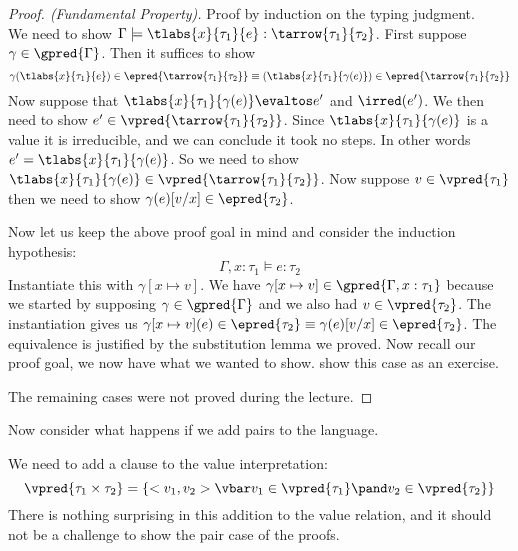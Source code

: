 \begin{proof}[Proof. (Fundamental Property)] Proof by induction on the typing judgment.
  \case{\TAbs} \\
We need to show $\Gamma \models \tlabs{x}{\tau_1}{e} : \tarrow{\tau_1}{\tau_2}$. First suppose $\gamma \in \gpred{\Gamma}$. Then it suffices to show
\[
  \gamma(\tlabs{x}{\tau_1}{e}) \in \epred{\tarrow{\tau_1}{\tau_2}} \equiv
  (\tlabs{x}{\tau_1}{\gamma(e)}) \in \epred{\tarrow{\tau_1}{\tau_2}}
\]
Now suppose that $\tlabs{x}{\tau_1}{\gamma(e)} \evaltos e'$ and $\irred(e')$. We then need to show $e' \in \vpred{\tarrow{\tau_1}{\tau_2}}$. Since $\tlabs{x}{\tau_1}{\gamma(e)}$ is a value it is irreducible, and we can conclude it took no steps. In other words $e' = \tlabs{x}{\tau_1}{\gamma(e)}$. So we need to show $\tlabs{x}{\tau_1}{\gamma(e)} \in \vpred{\tarrow{\tau_1}{\tau_2}}$. Now suppose $v \in \vpred{\tau_1}$ then we need to show $\gamma(e)[v/x] \in \epred{\tau_2}$.

Now let us keep the above proof goal in mind and consider the induction hypothesis:
\[
  \Gamma, x: \tau_1 \models e : \tau_2
\]
Instantiate this with $\gamma[x \mapsto v]$. We have $\gamma[x \mapsto v] \in \gpred{\Gamma, x : \tau_1}$ because we started by supposing $\gamma \in \gpred{\Gamma}$ and we also had $v \in \vpred{\tau_2}$. The instantiation gives us $\gamma[x \mapsto v] (e) \in  \epred{\tau_2} \equiv \gamma(e)[v/x] \in \epred{\tau_2}$. The equivalence is justified by the substitution lemma we proved. Now recall our proof goal, we now have what we wanted to show.
\case{\TApp} show this case as an exercise.

The remaining cases were not proved during the lecture.
\end{proof}
Now consider what happens if we add pairs to the language. 
\begin{comment}
\begin{align*}
  &\fst <v_1,v_2> \evalto v_1 \\
  &\snd <v_1,v_2> \evalto v_2
\end{align*}
\end{comment}
We need to add a clause to the value interpretation:
\[
  \vpred{\tau_1 \times \tau_2} = \{<v_1,v_2> \vbar v_1 \in \vpred{\tau_1} \pand v_2 \in \vpred{\tau_2}\}
\]
There is nothing surprising in this addition to the value relation, and it should not be a challenge to show the pair case of the proofs.


